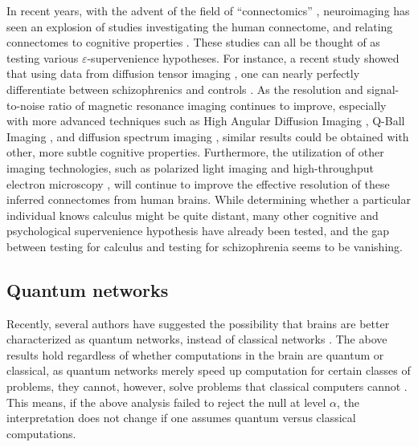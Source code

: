 \documentclass{article}
\newcommand{\eps}{\varepsilon}
\begin{document}
In recent years, with the advent of the field of ``connectomics'' \cite{SpornsKotter05,Hagmann05}, neuroimaging has seen an explosion of studies investigating the human connectome, and relating connectomes to cognitive properties \cite{Jones10}.  These studies can all be thought of as testing various $\eps$-supervenience hypotheses.  For instance, a recent study showed that using data from diffusion tensor imaging \cite{Basser94}, one can nearly perfectly differentiate between schizophrenics and controls \cite{ArdekaniSzeszko10}.  As the resolution and signal-to-noise ratio of magnetic resonance imaging continues to improve, especially with more advanced techniques such as High Angular Diffusion Imaging \cite{TuchWedeen02}, Q-Ball Imaging \cite{Tuch04}, and diffusion spectrum imaging \cite{WedeenWeisskoff05}, similar results could be obtained with other, more subtle cognitive properties.  Furthermore, the utilization of other imaging technologies, such as polarized light imaging \cite{PalmAmunts10} and high-throughput electron microscopy \cite{DenkHorstmann04,HayworthLichtman06}, will continue to improve the effective resolution of these inferred connectomes from human brains. While determining whether a particular individual knows calculus might be quite distant, many other cognitive and psychological supervenience hypothesis have already been tested, and the gap between testing for calculus and testing for schizophrenia seems to be vanishing.





\subsection{Quantum networks} %
\label{par:quantum_networks}

Recently, several authors have suggested the possibility that brains are better characterized as quantum networks, instead of classical networks \cite{Penrose,check_book}.  The above results hold regardless of whether computations in the brain are quantum or classical, as quantum networks merely speed up computation for certain classes of problems, they cannot, however, solve problems that classical computers cannot \cite{NielsenChuang00}.  This means, if the above analysis failed to reject the null at level $\alpha$, the interpretation does not change if one assumes quantum versus classical computations.
\end{document}
